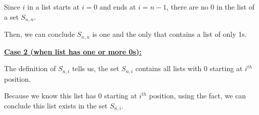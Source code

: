 \documentclass[12pt]{article}
\begin{document}
\begin{enumerate}[a.]
\begin{mdframed}
        \bigskip

        Since $i$ in a list starts at $i = 0$ and ends at $i = n-1$, there are no 0
        in the list of a set $S_{n,n}$.

        \bigskip

        Then, we can conclude $S_{n,n}$ is one and the only that contains a list of only 1s.

        \bigskip

        \underline{\textbf{Case 2 (when list has one or more 0s):}}

        \bigskip

        \color{red}
        The definition of $S_{n,i}$ tells us, the set $S_{n,i}$ contains
        all lists with 0 starting at $i^{th}$ position.
        \color{black}

        \bigskip

        Because we know this list has 0 starting at $i^{th}$ position, \color{red}using the
        fact\color{black}, we can conclude this list exists in the set $S_{n,i}$.

    \end{mdframed}


\end{enumerate}
\end{document}
